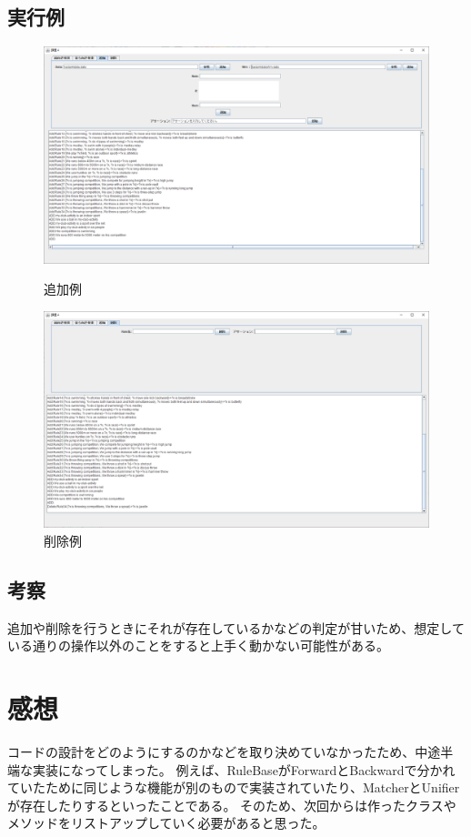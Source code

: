\documentclass{jarticle}
\begin{document}
\subsection{実行例}
\begin{figure}[!hbt]
  \centering
  \includegraphics[bb=0 0 1586 893,width=1.2\linewidth]{GUI2.png}
  \caption{追加例}
  \label{fig:Add}
  \centering
  \includegraphics[bb=0 0 1586 893,width=1.2\linewidth]{GUI3.png}
  \caption{削除例}
  \label{fig:Remove}

  
\end{figure}
\subsection{考察}
追加や削除を行うときにそれが存在しているかなどの判定が甘いため、想定している通りの操作以外のことをすると上手く動かない可能性がある。

\section{感想}
コードの設計をどのようにするのかなどを取り決めていなかったため、中途半端な実装になってしまった。
例えば、RuleBaseがForwardとBackwardで分かれていたために同じような機能が別のもので実装されていたり、MatcherとUnifierが存在したりするといったことである。
そのため、次回からは作ったクラスやメソッドをリストアップしていく必要があると思った。
\end{document}
